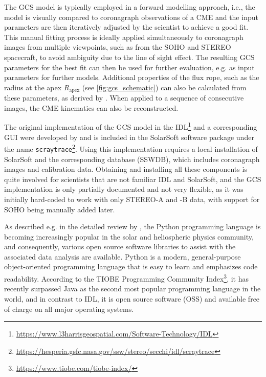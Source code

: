 The \ac{GCS} model is typically employed in a forward modelling approach, i.e., the model is visually compared to coronagraph observations of a \ac{CME} and the input parameters are then iteratively adjusted by the scientist to achieve a good fit. This manual fitting process is ideally applied simultaneously to coronagraph images from multiple viewpoints, such as from the \ac{SOHO} and \ac{STEREO} spacecraft, to avoid ambiguity due to the line of sight effect. The resulting \ac{GCS} parameters for the best fit can then be used for further evaluation, e.g. as input parameters for further models. Additional properties of the flux rope, such as the radius at the apex $R_\text{apex}$ (see \autoref{fig:gcs_schematic}) can also be calculated from these parameters, as derived by \citep{Thernisien-2011-GCS}. When applied to a sequence of consecutive images, the \ac{CME} kinematics can also be reconstructed.

The original implementation of the \ac{GCS} model in the \ac{IDL}\footnote{\url{https://www.l3harrisgeospatial.com/Software-Technology/IDL}} and a corresponding \ac{GUI} were developed by \citet{Thernisien-2006-GCS} and is included in the SolarSoft software package \citep{Freeland-1998-SolarSoft} under the name \texttt{scraytrace}\footnote{\url{https://hesperia.gsfc.nasa.gov/ssw/stereo/secchi/idl/scraytrace}}.
Using this implementation requires a local installation of SolarSoft and the corresponding database (SSWDB), which includes coronagraph images and calibration data. Obtaining and installing all these components is quite involved for scientists that are not familiar \ac{IDL} and SolarSoft, and the \ac{GCS} implementation is only partially documented and not very flexible, as it was initially hard-coded to work with only \ac{STEREO}-A and -B data, with support for \ac{SOHO} being manually added later.

As described e.g. in the detailed review by \citet{Burrell-2018}, the Python programming language is becoming increasingly popular in the solar and heliospheric physics community, and consequently, various open source software libraries to assist with the associated data analysis are available. Python is a modern, general-purpose object-oriented programming language that is easy to learn and emphasizes code readability. According to the TIOBE Programming Community Index\footnote{\url{https://www.tiobe.com/tiobe-index/}}, it has recently surpassed Java as the second most popular programming language in the world, and in contrast to \ac{IDL}, it is open source software (OSS) and available free of charge on all major operating systems.


